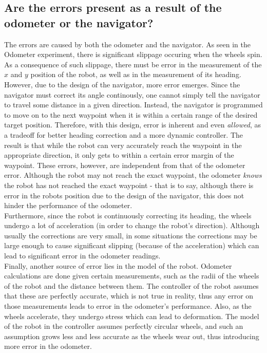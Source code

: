 \documentclass[11pt]{article}
\begin{document}
\subsection{Are the errors present as a result of the odometer or the navigator?}
The errors are caused by both the odometer and the navigator. As seen in the Odometer experiment, there
is significant slippage occuring when the wheels spin. As a consequence of such slippage, there must
be error in the measurement of the $x$ and $y$ position of the robot, as well as in the measurement
of its heading. \\
However, due to the design of the navigator, more error emerges. Since the navigator
must correct its angle continously, one cannot simply tell the navigator to travel some distance in
a given direction. Instead, the navigator is programmed to move on to the next waypoint when it is
within a certain range of the desired target position. Therefore, with this design, error is
inherent and even \textit{allowed}, as a tradeoff for better heading correction and a more dynamic
controller. The result is that
while the robot can very accurately reach the waypoint in the appropriate direction, it only gets
to within a certain error margin of the waypoint. These errors, however, are independent from that of
the odometer error. Although the robot may not reach the exact waypoint, the odometer \textit{knows}
the robot has not reached the exact waypoint - that is to say, although there is error in the robots
position due to the design of the navigator, this does not hinder the performance of the odometer.
\\
Furthermore, since the robot is continuously correcting its heading, the wheels undergo a lot of
acceleration (in order to change the robot's direction). Although usually the corrections are very
small, in some situations the corrections may be large enough to cause significant slipping (because
of the acceleration) which can lead to significant error in the odometer readings.\\
Finally, another source of error lies in the model of the robot. Odometer calculations are done
given certain measurements, such as the radii of the wheels of the robot and the distance between
them. The controller of the robot assumes that these are perfectly accurate, which is not true in
reality, thus any error on those measurements leads to error in the odometer's performance. Also, as
the wheels accelerate, they undergo stress which can lead to deformation. The model of the robot in
the controller assumes perfectly circular wheels, and such an assumption grows less and less
accurate as the wheels wear out, thus introducing more error in the odometer.
\end{document}
